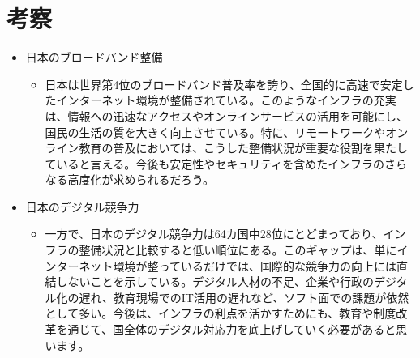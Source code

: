 \documentclass[a4paper,11pt,dvipdfmx]{ujarticle}
\begin{document}
\section{考察}
%
\begin{itemize}
    \item 日本のブロードバンド整備
    \begin{itemize}
        \item 日本は世界第4位のブロードバンド普及率を誇り、全国的に高速で安定したインターネット環境が整備されている。このようなインフラの充実は、情報への迅速なアクセスやオンラインサービスの活用を可能にし、国民の生活の質を大きく向上させている。特に、リモートワークやオンライン教育の普及においては、こうした整備状況が重要な役割を果たしていると言える。今後も安定性やセキュリティを含めたインフラのさらなる高度化が求められるだろう。
    \end{itemize}
\end{itemize}
\begin{itemize}
    \item 日本のデジタル競争力
    \begin{itemize}
        \item 一方で、日本のデジタル競争力は64カ国中28位にとどまっており、インフラの整備状況と比較すると低い順位にある。このギャップは、単にインターネット環境が整っているだけでは、国際的な競争力の向上には直結しないことを示している。デジタル人材の不足、企業や行政のデジタル化の遅れ、教育現場でのIT活用の遅れなど、ソフト面での課題が依然として多い。今後は、インフラの利点を活かすためにも、教育や制度改革を通じて、国全体のデジタル対応力を底上げしていく必要があると思います。
        
         
    \end{itemize}
\end{itemize}

%


\end{document}
